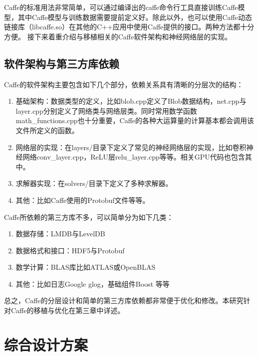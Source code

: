 Caffe的标准用法非常简单，可以通过编译出的caffe命令行工具直接训练Caffe模型，其中Caffe模型与训练数据需要提前定义好。除此以外，也可以使用Caffe动态链接库（libcaffe.so）在其他的C++应用中使用Caffe提供的接口。两种方法都十分方便。
接下来着重介绍与移植相关的Caffe软件架构和神经网络层的实现。

\subsection{软件架构与第三方库依赖}
Caffe的软件架构主要包含如下几个部分，依赖关系具有清晰的分层次的结构：
\begin{enumerate}
\item 基础架构：数据类型的定义，比如blob.cpp定义了Blob数据结构，net.cpp与layer.cpp分别定义了网络类与网络层类。同时常用数学函数math\_functions.cpp也十分重要，Caffe的各种大运算量的计算基本都会调用该文件所定义的函数。
\item 网络层的实现：在layers/目录下定义了常见的神经网络层的实现，比如卷积神经网络conv\_layer.cpp，ReLU层relu\_layer.cpp等等。相关GPU代码也包含其中。
\item 求解器实现：在solvers/目录下定义了多种求解器。
\item 其他：比如Caffe使用的Protobuf文件等等。
\end{enumerate}

Caffe所依赖的第三方库不多，可以简单分为如下几类：
\begin{enumerate}
\item 数据存储：LMDB与LevelDB
\item 数据格式和接口：HDF5与Protobuf
\item 数学计算：BLAS库比如ATLAS或OpenBLAS
\item 其他：比如日志Google glog，基础组件Boost 等等
\end{enumerate}

总之，Caffe的分层设计和简单的第三方库依赖都非常便于优化和修改。本研究针对Caffe的移植与优化在第三章中详述。

\section{综合设计方案}


